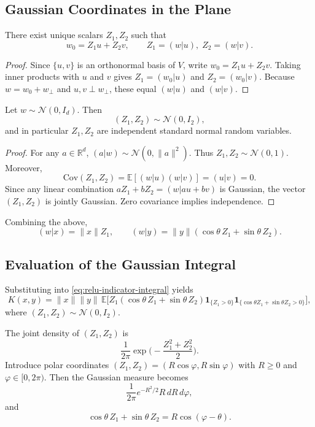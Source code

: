 \subsection{Gaussian Coordinates in the Plane}

\begin{lemma}[Coordinates of $w_0$]
	\label{lem:w0-coords}
	There exist unique scalars $Z_1,Z_2$ such that
	\[
		w_0=Z_1u+Z_2v,
		\qquad
		Z_1=(w|u),\; Z_2=(w|v).
	\]
\end{lemma}

\begin{proof}
	Since $\{u,v\}$ is an orthonormal basis of $V$, write $w_0=Z_1u+Z_2v$.
	Taking inner products with $u$ and $v$ gives $Z_1=(w_0|u)$ and $Z_2=(w_0|v)$.
	Because $w=w_0+w_\perp$ and $u,v\perp w_\perp$, these equal $(w|u)$ and $(w|v)$.
\end{proof}

\begin{lemma}[Distribution of $(Z_1,Z_2)$]
	\label{lem:z-gaussian}
	Let $w\sim\mathcal N(0,I_d)$. Then
	\[
		(Z_1,Z_2)\sim\mathcal N(0,I_2),
	\]
	and in particular $Z_1,Z_2$ are independent standard normal random variables.
\end{lemma}

\begin{proof}
	For any $a\in\mathbb R^d$, $(a|w)\sim\mathcal N(0,\|a\|^2)$.
	Thus $Z_1,Z_2\sim\mathcal N(0,1)$.
	Moreover,
	\[
		\mathrm{Cov}(Z_1,Z_2)=\mathbb E[(w|u)(w|v)]=(u|v)=0.
	\]
	Since any linear combination $aZ_1+bZ_2=(w|au+bv)$ is Gaussian, the vector
	$(Z_1,Z_2)$ is jointly Gaussian. Zero covariance implies independence.
\end{proof}

Combining the above,
\[
	(w|x)=\|x\|Z_1,
	\qquad
	(w|y)=\|y\|(\cos\theta\,Z_1+\sin\theta\,Z_2).
\]

\subsection{Evaluation of the Gaussian Integral}

Substituting into \eqref{eq:relu-indicator-integral} yields
\begin{equation}
	\label{eq:kernel-2d}
	K(x,y)
	=
	\|x\|\|y\|\,
	\mathbb E\Big[
		Z_1(\cos\theta\,Z_1+\sin\theta\,Z_2)
		\mathbf 1_{\{Z_1>0\}}
		\mathbf 1_{\{\cos\theta Z_1+\sin\theta Z_2>0\}}
		\Big],
\end{equation}
where $(Z_1,Z_2)\sim\mathcal N(0,I_2)$.

The joint density of $(Z_1,Z_2)$ is
\[
	\frac{1}{2\pi}\exp\!\Big(-\frac{Z_1^2+Z_2^2}{2}\Big).
\]
Introduce polar coordinates $(Z_1,Z_2)=(R\cos\varphi,R\sin\varphi)$ with
$R\ge 0$ and $\varphi\in[0,2\pi)$. Then the Gaussian measure becomes
\[
	\frac{1}{2\pi}e^{-R^2/2}R\,dR\,d\varphi,
\]
and
\[
	\cos\theta\,Z_1+\sin\theta\,Z_2 = R\cos(\varphi-\theta).
\]

